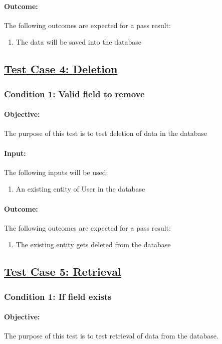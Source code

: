 \documentclass{article}
\begin{document}
\paragraph{Outcome:} The following outcomes are expected for a pass result:
\begin{enumerate}
	\item The data will be saved into the database
\end{enumerate}

\subsection{\underline{Test Case 4: Deletion}}\label{test4}
\subsubsection{Condition 1: Valid field to remove }
\paragraph{Objective:} The purpose of this test is to test deletion of data in the database
\paragraph{Input:} The following inputs will be used:
\begin{enumerate}
	\item An existing entity of User in the database
\end{enumerate}
\paragraph{Outcome:} The following outcomes are expected for a pass result:
\begin{enumerate}
	\item The existing entity gets deleted from the database 
\end{enumerate}

\subsection{\underline{Test Case 5: Retrieval}}\label{test5}
\subsubsection{Condition 1: If field exists }
\paragraph{Objective:} The purpose of this test is to test retrieval of data from the database.
\end{document}
